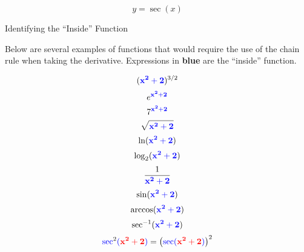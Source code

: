 \documentclass{siproblemset}
\newcommand{\inside}{\mathbf{\color{blue} x^2+2}}
\begin{document}
    $$y=\sec(x)$$
    \newpage
    
    \thispagestyle{empty} 
    \begin{center}
        {\Large Identifying the ``Inside'' Function}
        
        {\large Below are several examples of functions that would require the use of the chain rule when taking the derivative. Expressions in \textbf{\color{blue} blue} are the ``inside'' function.}
    \end{center}
    \tinysp

    \Large
    \begin{multicols}{3}\noindent
        $$(\inside)^{3/2}$$
        \tinysp
        $$e^{\inside}$$
        \tinysp
        $$7^{\inside}$$
        \tinysp
        $$\sqrt{\inside}$$
        \columnbreak
        $$\ln(\inside)$$
        \tinysp
        $$\log_2(\inside)$$
        \tinysp
        $$\dfrac{1}{\inside}$$
        \columnbreak
        $$\sin(\inside)$$
        \tinysp
        $$\arccos(\inside)$$
        \tinysp
        $$\sec^{-1}(\inside)$$
        \tinysp
        $$\mathbf{\color{blue}\sec}^2\mathbf{\color{blue}(}\mathbf{\color{red}x^2+2}\mathbf{\color{blue})}=\left(\mathbf{\color{blue}\sec(}\mathbf{\color{red}x^2+2}\mathbf{\color{blue})}\right)^2$$
    \end{multicols}
\end{document}
